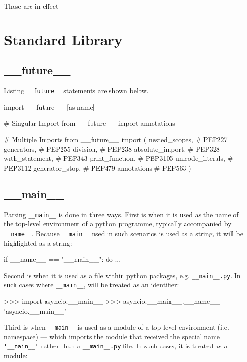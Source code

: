 \documentclass[oneside]{syntexpydoc}
\begin{document}
These are in effect

\chapter{Standard Library}
\pagebreak
\section{\_\_future\_\_}
Listing \verb|__future__| statements are shown below.

\begin{python}
import __future__ [as name]

# Singular Import
from __future__ import annotations

# Multiple Imports
from __future__ import (
    nested_scopes,      # PEP227
    generators,         # PEP255
    division,           # PEP238
    absolute_import,    # PEP328
    with_statement,     # PEP343
    print_function,     # PEP3105
    unicode_literals,   # PEP3112
    generator_stop,     # PEP479
    annotations         # PEP563
)
\end{python}

\section{\_\_main\_\_}
Parsing \verb|__main__| is done in three ways.
First is when it is used as the name of the top-level environment of a python programme, typically accompanied by \verb|__name__|. Because \verb|__main__| used in such scenarios is used as a string, it will be highlighted as a string:

\begin{python}
if __name__ == "__main__":
    do ...
\end{python}

Second is when it is used as a file within python packages, e.g. \verb|__main__.py|. In such cases where \verb|__main__|, will be treated as an identifier:

\begin{python}
>>> import asyncio.__main__
>>> asyncio.__main__.__name__
'asyncio.__main__'
\end{python}

Third is when \verb|__main__| is used as a module of a top-level environment (i.e. namespace) --- which imports the module that received the special name \verb|'__main__'| rather than a \verb|__main__.py| file. In such cases, it is treated as a module:
\end{document}
